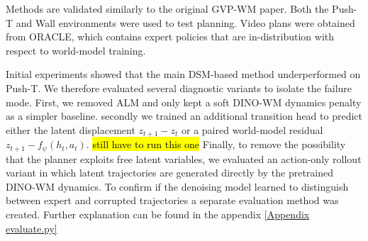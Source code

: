 Methods are validated similarly to the original GVP-WM paper. Both the Push-T and Wall environments were used to test planning. Video plans were obtained from ORACLE, which contains expert policies that are in-distribution with respect to world-model training.

Initial experiments showed that the main DSM-based method underperformed on Push-T. We therefore evaluated several diagnostic variants to isolate the failure mode. First, we removed ALM and only kept a soft DINO-WM dynamics penalty as a simpler baseline. secondly we trained an additional transition head to predict either the latent displacement \(z_{t+1}-z_t\) or a paired world-model residual \(z_{t+1}-f_\psi(h_t,a_t)\). \hl{still have to run this one} Finally, to remove the possibility that the planner exploits free latent variables, we evaluated an action-only rollout variant in which latent trajectories are generated directly by the pretrained DINO-WM dynamics. To confirm if the denoising model learned to distinguish between expert and corrupted trajectories a separate evaluation method was created. Further explanation can be found in the appendix \ref{Appendix evaluate.py}



